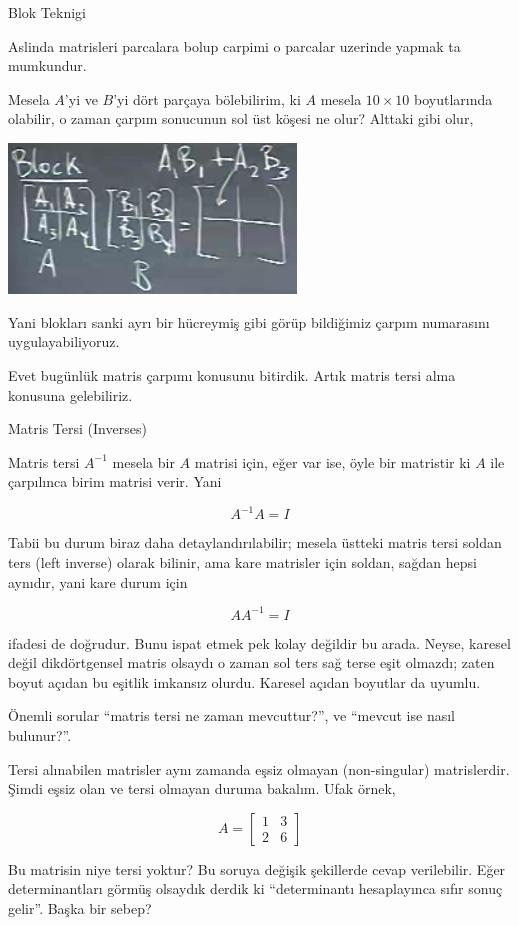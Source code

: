 \documentclass[12pt,fleqn]{article}\usepackage{../../common}
\begin{document}
Blok Teknigi

Aslinda matrisleri parcalara bolup carpimi o parcalar uzerinde yapmak ta
mumkundur. 

Mesela $A$'yi ve $B$'yi dört parçaya bölebilirim, ki $A$ mesela $10 \times
10$ boyutlarında olabilir, o zaman çarpım sonucunun sol üst köşesi ne olur?
Alttaki gibi olur,

\includegraphics[height=4cm]{3_02.png}

Yani blokları sanki ayrı bir hücreymiş gibi görüp bildiğimiz çarpım
numarasını uygulayabiliyoruz.

Evet bugünlük matris çarpımı konusunu bitirdik. Artık matris tersi alma
konusuna gelebiliriz. 

Matris Tersi (Inverses)

Matris tersi $A^{-1}$ mesela bir $A$ matrisi için, eğer var ise, öyle bir
matristir ki $A$ ile çarpılınca birim matrisi verir. Yani

$$ A^{-1} A = I $$

Tabii bu durum biraz daha detaylandırılabilir; mesela üstteki matris tersi
soldan ters (left inverse) olarak bilinir, ama kare matrisler için soldan,
sağdan hepsi aynıdır, yani kare durum için 

$$ AA^{-1} = I $$

ifadesi de doğrudur. Bunu ispat etmek pek kolay değildir bu arada. Neyse,
karesel değil dikdörtgensel matris olsaydı o zaman sol ters sağ terse eşit
olmazdı; zaten boyut açıdan bu eşitlik imkansız olurdu. Karesel açıdan
boyutlar da uyumlu. 

Önemli sorular ``matris tersi ne zaman mevcuttur?'', ve ``mevcut ise nasıl
bulunur?''.

Tersi alınabilen matrisler aynı zamanda eşsiz olmayan (non-singular)
matrislerdir. Şimdi eşsiz olan ve tersi olmayan duruma bakalım. Ufak örnek, 

$$ 
A = 
\left[\begin{array}{rr}
1 & 3 \\ 2 & 6
\end{array}\right]
 $$

Bu matrisin niye tersi yoktur? Bu soruya değişik şekillerde cevap
verilebilir. Eğer determinantları görmüş olsaydık derdik ki ``determinantı
hesaplayınca sıfır sonuç gelir''. Başka bir sebep? 
\end{document}
